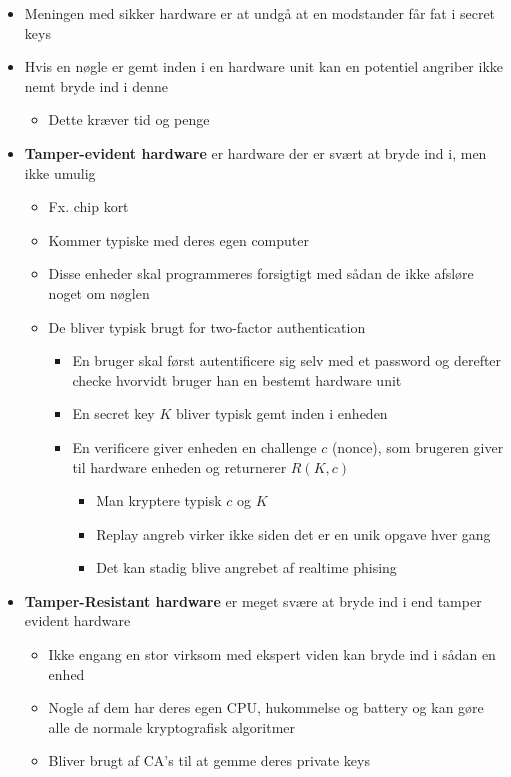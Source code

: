 \documentclass[a4, english]{article}
\begin{document}
\begin{itemize}
	\item Meningen med sikker hardware er at undgå at en modstander får fat i secret keys
  \item Hvis en nøgle er gemt inden i en hardware unit kan en potentiel angriber ikke nemt bryde ind i denne
  \begin{itemize}
  	\item Dette kræver tid og penge
  \end{itemize}
  \item \textbf{Tamper-evident hardware} er hardware der er svært at bryde ind i, men ikke umulig 
  \begin{itemize}
  	\item Fx. chip kort
    \item Kommer typiske med deres egen computer
    \item Disse enheder skal programmeres forsigtigt med sådan de ikke afsløre noget om nøglen
    \item De bliver typisk brugt for two-factor authentication
    \begin{itemize}
    	\item En bruger skal først autentificere sig selv med et password og derefter checke hvorvidt bruger han en bestemt hardware unit 
      \item En secret key $K$ bliver typisk gemt inden i enheden
      \item En verificere giver enheden en challenge $c$ (nonce), som brugeren giver til hardware enheden og returnerer $R(K,c)$
      \begin{itemize}
      	\item Man kryptere typisk $c$ og $K$
        \item Replay angreb virker ikke siden det er en unik opgave hver gang 
        \item Det kan stadig blive angrebet af realtime phising
      \end{itemize}
    \end{itemize}
  \end{itemize}
  \item \textbf{Tamper-Resistant hardware} er meget svære at bryde ind i end tamper evident hardware
  \begin{itemize}
  	\item Ikke engang en stor virksom med ekspert viden kan bryde ind i sådan en enhed
    \item Nogle af dem har deres egen CPU, hukommelse og battery og kan gøre alle de normale kryptografisk algoritmer
    \item Bliver brugt af CA's til at gemme deres private keys
  \end{itemize}
\end{itemize} 
\end{document}
